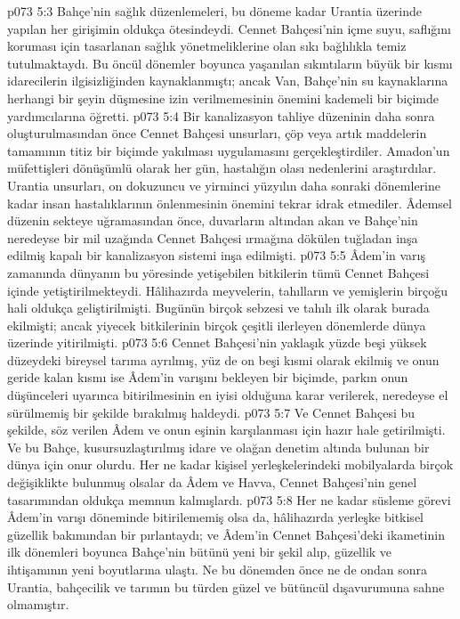 \vs p073 5:3 Bahçe’nin sağlık düzenlemeleri, bu döneme kadar Urantia üzerinde yapılan her girişimin oldukça ötesindeydi. Cennet Bahçesi’nin içme suyu, saflığını koruması için tasarlanan sağlık yönetmeliklerine olan sıkı bağlılıkla temiz tutulmaktaydı. Bu öncül dönemler boyunca yaşanılan sıkıntıların büyük bir kısmı idarecilerin ilgisizliğinden kaynaklanmıştı; ancak Van, Bahçe’nin su kaynaklarına herhangi bir şeyin düşmesine izin verilmemesinin önemini kademeli bir biçimde yardımcılarına öğretti.
\vs p073 5:4 Bir kanalizasyon tahliye düzeninin daha sonra oluşturulmasından önce Cennet Bahçesi unsurları, çöp veya artık maddelerin tamamının titiz bir biçimde yakılması uygulamasını gerçekleştirdiler. Amadon’un müfettişleri dönüşümlü olarak her gün, hastalığın olası nedenlerini araştırdılar. Urantia unsurları, on dokuzuncu ve yirminci yüzyılın daha sonraki dönemlerine kadar insan hastalıklarının önlenmesinin önemini tekrar idrak etmediler. Âdemsel düzenin sekteye uğramasından önce, duvarların altından akan ve Bahçe’nin neredeyse bir mil uzağında Cennet Bahçesi ırmağına dökülen tuğladan inşa edilmiş kapalı bir kanalizasyon sistemi inşa edilmişti.
\vs p073 5:5 Âdem’in varış zamanında dünyanın bu yöresinde yetişebilen bitkilerin tümü Cennet Bahçesi içinde yetiştirilmekteydi. Hâlihazırda meyvelerin, tahılların ve yemişlerin birçoğu hali oldukça geliştirilmişti. Bugünün birçok sebzesi ve tahılı ilk olarak burada ekilmişti; ancak yiyecek bitkilerinin birçok çeşitli ilerleyen dönemlerde dünya üzerinde yitirilmişti.
\vs p073 5:6 Cennet Bahçesi’nin yaklaşık yüzde beşi yüksek düzeydeki bireysel tarıma ayrılmış, yüz de on beşi kısmi olarak ekilmiş ve onun geride kalan kısmı ise Âdem’in varışını bekleyen bir biçimde, parkın onun düşünceleri uyarınca bitirilmesinin en iyisi olduğuna karar verilerek, neredeyse el sürülmemiş bir şekilde bırakılmış haldeydi.
\vs p073 5:7 Ve Cennet Bahçesi bu şekilde, söz verilen Âdem ve onun eşinin karşılanması için hazır hale getirilmişti. Ve bu Bahçe, kusursuzlaştırılmış idare ve olağan denetim altında bulunan bir dünya için onur olurdu. Her ne kadar kişisel yerleşkelerindeki mobilyalarda birçok değişiklikte bulunmuş olsalar da Âdem ve Havva, Cennet Bahçesi’nin genel tasarımından oldukça memnun kalmışlardı.
\vs p073 5:8 Her ne kadar süsleme görevi Âdem’in varışı döneminde bitirilememiş olsa da, hâlihazırda yerleşke bitkisel güzellik bakımından bir pırlantaydı; ve Âdem’in Cennet Bahçesi’deki ikametinin ilk dönemleri boyunca Bahçe’nin bütünü yeni bir şekil alıp, güzellik ve ihtişamının yeni boyutlarına ulaştı. Ne bu dönemden önce ne de ondan sonra Urantia, bahçecilik ve tarımın bu türden güzel ve bütüncül dışavurumuna sahne olmamıştır.
